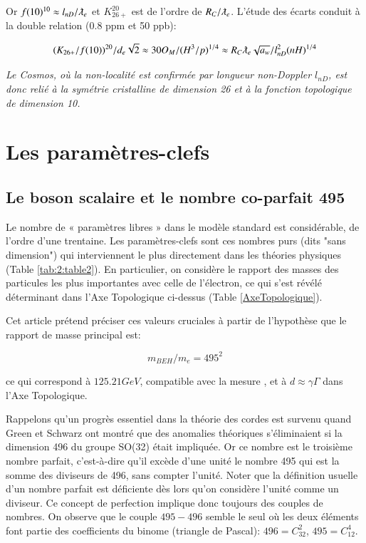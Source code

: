 \documentclass[a4paper,9pt]{article}
\begin{document}
 Or $f(10)^{10} \approx l_{nD}/\lambdabar_e$ et $K_{26+}^{20}$ est de l'ordre de $R_C/\lambdabar_e$. L'étude des écarts conduit à la double relation (0.8 ppm et 50 ppb):

\begin{equation}
 (K_{26+}/f(10))^{20}/d_e \sqrt 2 \approx 30 O_M / (H^3/p)^{1/4} \approx R_C \lambdabar_e \sqrt {a_w} /l_{nD}^2 (nH)^{1/4} 
 \end{equation}
 
 \textit{Le Cosmos, où la non-localité est confirmée par longueur non-Doppler $l_{nD}$, est donc relié à la symétrie cristalline de dimension 26 et à la fonction topologique de dimension 10.} 

\section{Les paramètres-clefs}

\subsection{Le boson scalaire et le nombre co-parfait 495} 
Le nombre de « paramètres libres » dans le modèle standard est considérable, de l'ordre d’une trentaine. Les paramètres-clefs sont ces nombres purs (dits "sans dimension") qui interviennent le plus directement dans les théories physiques (Table \ref{tab:2:table2}). En particulier, on considère le rapport des masses des particules les plus importantes avec celle de l'électron, ce qui s'est révélé déterminant dans l'Axe Topologique ci-dessus (Table \ref{AxeTopologique}). 

Cet article prétend préciser ces valeurs cruciales à partir de l'hypothèse que le rapport de masse principal est:

\begin{equation}
 m_{BEH}/m_e = 495^2 
 \end{equation}

ce qui correspond à $125.21 GeV$, compatible avec la mesure \cite{Tanabashi}, et à $d \approx \gamma\Gamma$ dans l'Axe Topologique.

Rappelons qu'un progrès essentiel dans la théorie des cordes est survenu quand Green et Schwarz \cite{Green} ont montré que des anomalies théoriques s'éliminaient si la dimension 496 du groupe SO(32) était impliquée. Or ce nombre est le troisième nombre parfait, c'est-à-dire qu'il excède d'une unité le nombre 495 qui est la somme des diviseurs de 496, sans compter l'unité. Noter que la définition usuelle d'un nombre parfait est déficiente dès lors qu'on considère l'unité comme un diviseur. Ce concept de perfection implique donc toujours des couples de nombres. On observe que le couple $495-496$ semble le seul où les deux éléments font partie des coefficients du binome (triangle de Pascal): $ 496 = C_{32}^2$, $495 = C_{12}^4$. 
\end{document}
